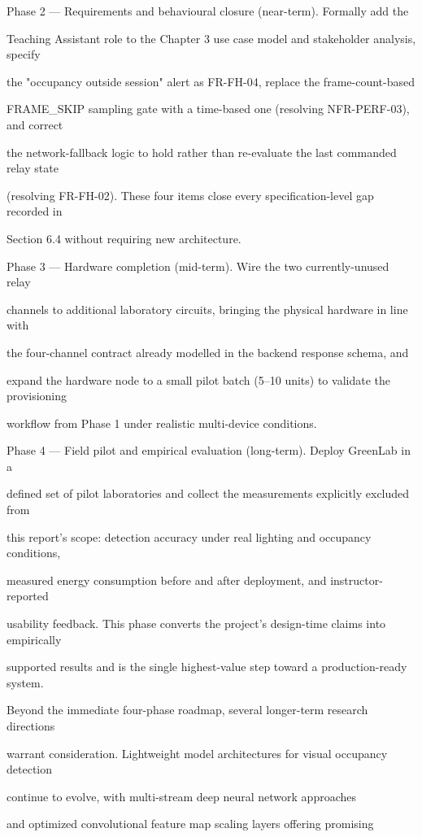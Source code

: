 Phase 2 --- Requirements and behavioural closure (near-term). Formally add the

Teaching Assistant role to the Chapter 3 use case model and stakeholder analysis, specify

the "occupancy outside session" alert as FR-FH-04, replace the frame-count-based

FRAME\_SKIP sampling gate with a time-based one (resolving NFR-PERF-03), and correct

the network-fallback logic to hold rather than re-evaluate the last commanded relay state

(resolving FR-FH-02). These four items close every specification-level gap recorded in

Section 6.4 without requiring new architecture.

Phase 3 --- Hardware completion (mid-term). Wire the two currently-unused relay

channels to additional laboratory circuits, bringing the physical hardware in line with

the four-channel contract already modelled in the backend response schema, and

expand the hardware node to a small pilot batch (5--10 units) to validate the provisioning

workflow from Phase 1 under realistic multi-device conditions.

Phase 4 --- Field pilot and empirical evaluation (long-term). Deploy GreenLab in a

defined set of pilot laboratories and collect the measurements explicitly excluded from

this report's scope: detection accuracy under real lighting and occupancy conditions,

measured energy consumption before and after deployment, and instructor-reported

usability feedback. This phase converts the project's design-time claims into empirically

supported results and is the single highest-value step toward a production-ready system.

Beyond the immediate four-phase roadmap, several longer-term research directions

warrant consideration. Lightweight model architectures for visual occupancy detection

continue to evolve, with multi-stream deep neural network approaches \cite{mutiset2022}

and optimized convolutional feature map scaling layers \cite{park2024} oﬀering promising

